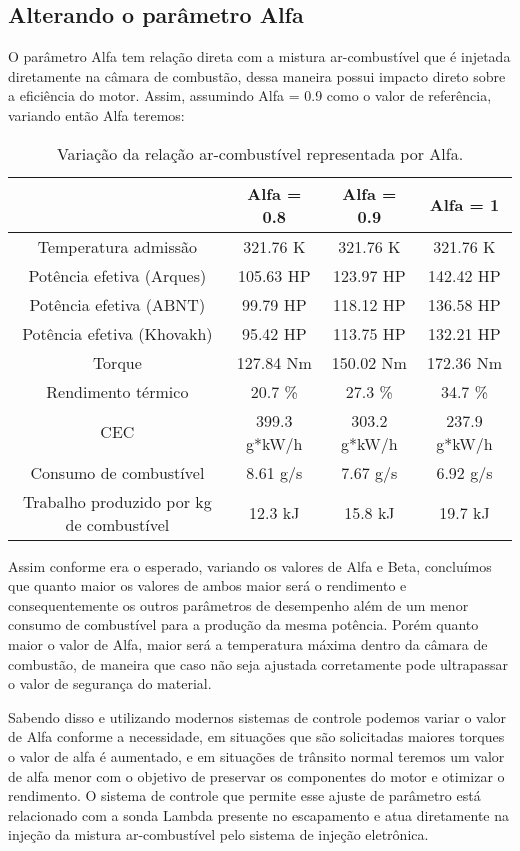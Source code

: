 \documentclass[a4paper]{article}
\begin{document}
\subsection{Alterando o parâmetro Alfa}
O parâmetro Alfa tem relação direta com a mistura ar-combustível que é injetada diretamente na câmara de combustão, dessa maneira possui impacto direto sobre a eficiência do motor. Assim, assumindo Alfa = 0.9 como o valor de referência, variando então Alfa teremos:

\begin{table}[!htb]
    \centering
    \begin{tabular}{|c|c|c|c|}
    \hline
    & Alfa = 0.8 & Alfa = 0.9 & Alfa = 1\\
    \hline
    Temperatura admissão & 321.76 K & 321.76 K & 321.76 K \\
    \hline
    Potência efetiva (Arques) & 105.63 HP & 123.97 HP & 142.42 HP \\
    \hline
    Potência efetiva (ABNT) & 99.79 HP & 118.12 HP & 136.58 HP \\
    \hline
    Potência efetiva (Khovakh) & 95.42 HP & 113.75 HP & 132.21 HP \\
    \hline
    Torque & 127.84 Nm & 150.02 Nm & 172.36 Nm \\
    \hline
    Rendimento térmico & 20.7 \% & 27.3 \% & 34.7 \% \\
    \hline
    CEC & 399.3 g*kW/h & 303.2 g*kW/h & 237.9 g*kW/h \\
    \hline
    Consumo de combustível & 8.61 g/s & 7.67 g/s & 6.92 g/s \\
    \hline
    Trabalho produzido por kg de combustível & 12.3 kJ  & 15.8 kJ & 19.7 kJ\\
    \hline
    \end{tabular}
    \caption{Variação da relação ar-combustível representada por Alfa.}
\end{table}
Assim conforme era o esperado, variando os valores de Alfa e Beta, concluímos que quanto maior os valores de ambos maior será o rendimento e consequentemente os outros parâmetros de desempenho além de um menor consumo de combustível para a produção da mesma potência. Porém quanto maior o valor de Alfa, maior será a temperatura máxima dentro da câmara de combustão, de maneira que caso não seja ajustada corretamente pode ultrapassar o valor de segurança do material.

Sabendo disso e utilizando modernos sistemas de controle podemos variar o valor de Alfa conforme a necessidade, em situações que são solicitadas maiores torques o valor de alfa é aumentado, e em situações de trânsito normal teremos um valor de alfa menor com o objetivo de preservar os componentes do motor e otimizar o rendimento. O sistema de controle que permite esse ajuste de parâmetro está relacionado com a sonda Lambda presente no escapamento e atua diretamente na injeção da mistura ar-combustível pelo sistema de injeção eletrônica.
\end{document}
